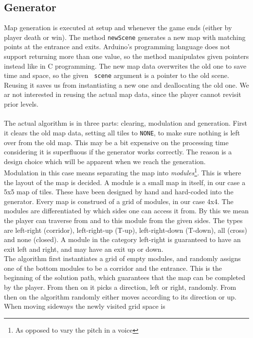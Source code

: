 \subsection{Generator} %
Map generation is executed at setup and whenever the game ends
(either by player death or win).
The method {\tt newScene} generates a new map with matching points at the entrance and exits.
Arduino's programming language does not support returning more than one value,
so the method manipulates given pointers instead like in C programming.  The
new map data overwrites the old one to save time and space, so the given {\tt
scene} argument is a pointer to the old scene.  Reusing it saves us from
instantiating a new one and deallocating the old one.  We ar not interested in
reusing the actual map data, since the player cannot revisit prior levels.\\\\
The actual algorithm is in three parts: clearing, modulation and generation.
First it clears the old map data, setting all tiles to {\tt NONE}, to make sure
nothing is left over from the old map. This may be a bit expensive on the
processing time considering it is superfluous if the generator works correctly.
The reason is a design choice which will be apparent when we reach the
generation.\\ %
Modulation in this case means separating the map into
\emph{modules}\footnote{As opposed to vary the pitch in a voice}.
This is where the layout of the map is decided. A module is a small map in
itself, in our case a 5x5 map of tiles.  These have been designed by hand and
hard-coded into the generator. Every map is construed of a grid of modules, in
our case 4x4. The modules are differentiated by which sides one can access it
from.  By this we mean the player can traverse from and to this module from the
given sides.  The types are left-right (corridor), left-right-up (T-up),
left-right-down (T-down), all (cross) and none (closed). A module in the
category left-right is guaranteed to have an exit left and right, and may have
an exit up or down.\\ The algorithm first instantiates a grid of empty modules,
and randomly assigns one of the bottom modules to be a corridor and the
entrance. This is the beginning of the solution path, which guarantees that the
map can be completed by the player. From then on it picks a direction, left or
right, randomly. From then on the algorithm randomly either moves according to
its direction or up. When moving sideways the newly visited grid space is
